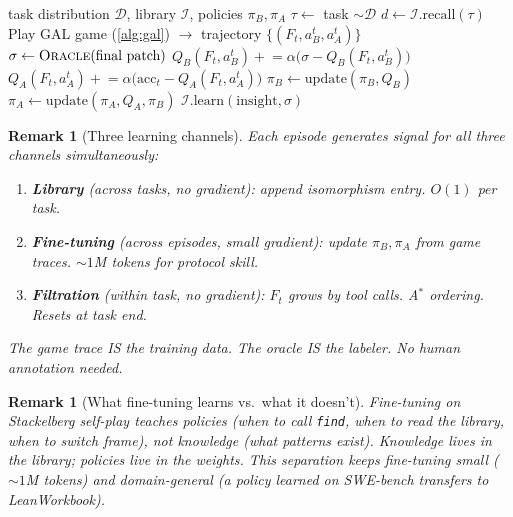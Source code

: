 \documentclass{article}
\newtheorem{remark}[theorem]{Remark}
\newcommand{\calD}{\mathcal{D}}
\newcommand{\calI}{\mathcal{I}}
\begin{document}
\begin{algorithm}[t]
\caption{Stackelberg Self-Play for GAL}\label{alg:self-play}
\begin{algorithmic}[1]
\REQUIRE task distribution $\calD$, library $\calI$,
  policies $\pi_B, \pi_A$
  \STATE $\tau \gets$ task $\sim \calD$
  \STATE $d \gets \calI.\mathrm{recall}(\tau)$
  \STATE Play GAL game (\cref{alg:gal}) $\to$ trajectory
    $\{(F_t, a_B^t, a_A^t)\}$
  \STATE $\sigma \gets \textsc{Oracle}(\text{final patch})$
    \hfill{}
  \STATE {}
    \STATE $Q_B(F_t, a_B^t) \mathrel{+}=
      \alpha\bigl(\sigma - Q_B(F_t, a_B^t)\bigr)$
    \STATE $Q_A(F_t, a_A^t) \mathrel{+}=
      \alpha\bigl(\text{acc}_t - Q_A(F_t, a_A^t)\bigr)$
  \ENDFOR
  \STATE {}
  \STATE $\pi_B \gets \mathrm{update}(\pi_B, Q_B)$
    \hfill{}
  \STATE $\pi_A \gets \mathrm{update}(\pi_A, Q_A, \pi_B)$
    \hfill{}
  \STATE {}
  \STATE $\calI.\mathrm{learn}(\text{insight}, \sigma)$
\ENDFOR
\end{algorithmic}
\end{algorithm}

\begin{remark}[Three learning channels]%
\label{rem:three-channels}
Each episode generates signal for all three channels
simultaneously:
\begin{enumerate}[label=(\roman*),nosep]
  \item \textbf{Library} (across tasks, no gradient):
    append isomorphism entry.  $O(1)$ per task.
  \item \textbf{Fine-tuning} (across episodes, small gradient):
    update $\pi_B, \pi_A$ from game traces.
    $\sim\!1$M tokens for protocol skill.
  \item \textbf{Filtration} (within task, no gradient):
    $F_t$ grows by tool calls.  A$^*$ ordering.
    Resets at task end.
\end{enumerate}
The game trace IS the training data.  The oracle IS the
labeler.  No human annotation needed.
\end{remark}

\begin{remark}[What fine-tuning learns vs.\ what it doesn't]%
\label{rem:finetune-scope}
Fine-tuning on Stackelberg self-play teaches \emph{policies}
(when to call \texttt{find}, when to read the library, when
to switch frame), not \emph{knowledge} (what patterns exist).
Knowledge lives in the library; policies live in the weights.
This separation keeps fine-tuning small ($\sim\!1$M tokens)
and domain-general (a policy learned on SWE-bench transfers
to LeanWorkbook).
\end{remark}
\end{document}
